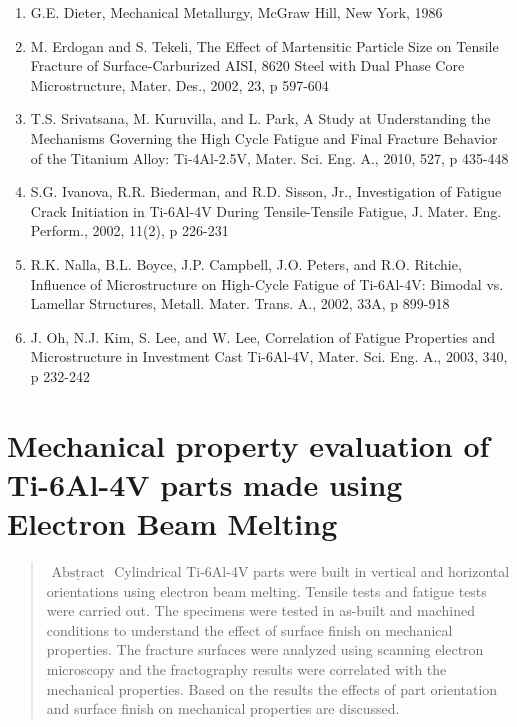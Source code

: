 \documentclass[10pt]{article}
\begin{document}
\begin{enumerate}
  \item G.E. Dieter, Mechanical Metallurgy, McGraw Hill, New York, 1986

  \item M. Erdogan and S. Tekeli, The Effect of Martensitic Particle Size on Tensile Fracture of Surface-Carburized AISI, 8620 Steel with Dual Phase Core Microstructure, Mater. Des., 2002, 23, p 597-604

  \item T.S. Srivatsana, M. Kuruvilla, and L. Park, A Study at Understanding the Mechanisms Governing the High Cycle Fatigue and Final Fracture Behavior of the Titanium Alloy: Ti-4Al-2.5V, Mater. Sci. Eng. A., 2010, 527, p 435-448

  \item S.G. Ivanova, R.R. Biederman, and R.D. Sisson, Jr., Investigation of Fatigue Crack Initiation in Ti-6Al-4V During Tensile-Tensile Fatigue, J. Mater. Eng. Perform., 2002, 11(2), p 226-231

  \item R.K. Nalla, B.L. Boyce, J.P. Campbell, J.O. Peters, and R.O. Ritchie, Influence of Microstructure on High-Cycle Fatigue of Ti-6Al-4V: Bimodal vs. Lamellar Structures, Metall. Mater. Trans. A., 2002, 33A, p 899-918

  \item J. Oh, N.J. Kim, S. Lee, and W. Lee, Correlation of Fatigue Properties and Microstructure in Investment Cast Ti-6Al-4V, Mater. Sci. Eng. A., 2003, 340, p 232-242

\end{enumerate}

\section*{Mechanical property evaluation of Ti-6Al-4V parts made using Electron Beam Melting }


\begin{abstract}
$\underline{\text { Abstract }}$ Cylindrical Ti-6Al-4V parts were built in vertical and horizontal orientations using electron beam melting. Tensile tests and fatigue tests were carried out. The specimens were tested in as-built and machined conditions to understand the effect of surface finish on mechanical properties. The fracture surfaces were analyzed using scanning electron microscopy and the fractography results were correlated with the mechanical properties. Based on the results the effects of part orientation and surface finish on mechanical properties are discussed.
\end{abstract}
\end{document}
